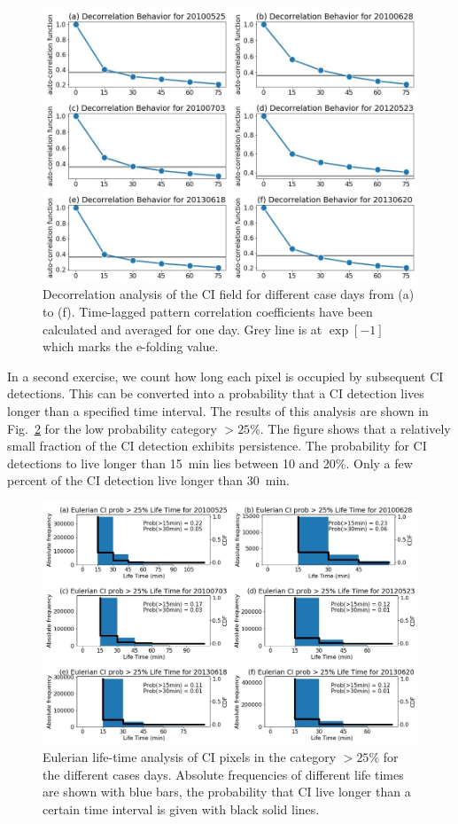\begin{figure}
\centering
\includegraphics[width=\textwidth]{Grafiken/Abbildungen/decorrelation_CI.jpg}
\caption{Decorrelation analysis of the CI field for different case days from (a) to (f). Time-lagged pattern correlation coefficients have been calculated and averaged for one day. Grey line is at $\exp[-1]$ which marks the e-folding value. }
\label{fig:decorr_analysis}
\end{figure}

In a second exercise, we count how long each pixel is occupied by subsequent CI detections. This can be converted into a probability that a CI detection lives longer than a specified time interval. The results of this analysis are shown in Fig.~\ref{fig:life-time} for the low probability category $>25\%$. The figure shows that a relatively small fraction of the CI detection exhibits persistence. The probability for CI detections to live longer than 15~min lies between 10 and 20\%. Only a few percent of the CI detection live longer than 30~min.

\begin{figure}
\centering
\includegraphics[width=\textwidth]{Grafiken/Abbildungen/life_time_CI25.jpg}
\caption{Eulerian life-time analysis of CI pixels in the category $>25\%$ for the different cases days.  Absolute frequencies of different life times are shown with blue bars, the probability that CI live longer than a certain time interval is given with black solid lines. }
\label{fig:life-time}
\end{figure}

